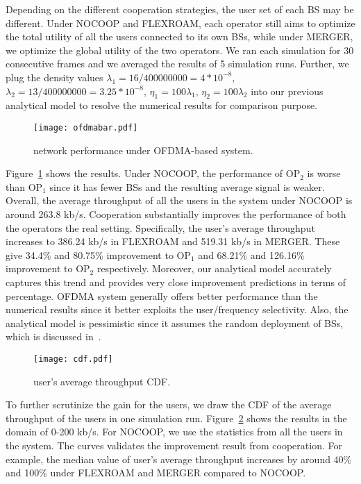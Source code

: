 \documentclass[conference]{IEEEtran}
\begin{document}
Depending on the different cooperation strategies, the user set of each BS may be different. Under NOCOOP and FLEXROAM, each operator still aims to optimize the total utility of all the users connected to its own BSs, while under MERGER, we optimize the global utility of the two operators. We ran each simulation for 30 consecutive frames and we averaged the results of 5 simulation runs. Further, we plug the density values $\lambda_1 = 16 / 400000000 = 4*10^{-8}$, $\lambda_2 = 13 / 400000000=3.25*10^{-8}$, $\eta_1 = 100 \lambda_1$, $\eta_2 = 100 \lambda_2$ into our previous analytical model to resolve the numerical results for comparison purpose.

\begin{figure}[htbp]
    \centerline{\texttt{[image: ofdmabar.pdf]}}
    \caption{
       network performance under OFDMA-based system.
    }
    \label{fig:ofdmabar}
    \vspace{-0.1in}
\end{figure}
Figure~\ref{fig:ofdmabar} shows the results. Under NOCOOP, the performance of OP$_2$ is worse than OP$_1$ since it has fewer BSs and the resulting average signal is weaker. Overall, the average throughput of all the users in the system under NOCOOP is around 263.8 kb/s. Cooperation substantially improves the performance of both the operators the real setting. Specifically, the user's average throughput increases to 386.24 kb/s in FLEXROAM and 519.31 kb/s in MERGER. These give 34.4\% and 80.75\% improvement to OP$_1$ and 68.21\% and 126.16\% improvement to OP$_2$ respectively. Moreover, our analytical model accurately captures this trend and provides very close improvement predictions in terms of percentage. OFDMA system generally offers better performance than the numerical results since it better exploits the user/frequency selectivity. Also, the analytical model is pessimistic since it assumes the random deployment of BSs, which is discussed in~\cite{Jeffrey@TCOM10}.

\begin{figure}[htbp]
    \centerline{\texttt{[image: cdf.pdf]}}
    \caption{
       user's average throughput CDF.
    }
    \label{fig:cdf}
    \vspace{-0.2in}
\end{figure}
To further scrutinize the gain for the users, we draw the CDF of the average throughput of the users in one simulation run. Figure~\ref{fig:cdf} shows the results in the domain of 0-200 kb/s. For NOCOOP, we use the statistics from all the users in the system. The  curves validates the improvement result from cooperation. For example, the median value of user's average throughput increases by around 40\% and 100\% under FLEXROAM and MERGER compared to NOCOOP.
\end{document}
